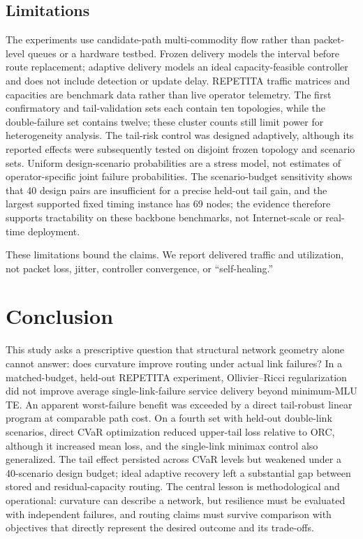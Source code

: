 \documentclass[preprint,12pt]{elsarticle}
\begin{document}
\subsection{Limitations}

The experiments use candidate-path multi-commodity flow rather than packet-level
queues or a hardware testbed. Frozen delivery models the interval before route
replacement; adaptive delivery models an ideal capacity-feasible controller and
does not include detection or update delay. REPETITA traffic matrices and
capacities are benchmark data rather than live operator telemetry. The
first confirmatory and tail-validation sets each contain ten topologies, while
the double-failure set contains twelve; these cluster counts still limit power
for heterogeneity analysis. The tail-risk control was designed adaptively,
although its reported effects were subsequently tested on disjoint frozen
topology and scenario sets. Uniform design-scenario probabilities are a stress
model, not estimates of operator-specific joint failure probabilities. The
scenario-budget sensitivity shows that 40 design pairs are insufficient for a
precise held-out tail gain, and the largest supported fixed timing instance has
69 nodes; the evidence therefore supports tractability on these backbone
benchmarks, not Internet-scale or real-time deployment.

These limitations bound the claims. We report delivered traffic and utilization,
not packet loss, jitter, controller convergence, or ``self-healing.''

\section{Conclusion}

This study asks a prescriptive question that structural network geometry alone
cannot answer: does curvature improve routing under actual link failures? In a
matched-budget, held-out REPETITA experiment, Ollivier--Ricci regularization did
not improve average single-link-failure service delivery beyond minimum-MLU TE.
An apparent worst-failure benefit was exceeded by a direct tail-robust linear
program at comparable path cost. On a fourth set with held-out double-link
scenarios, direct CVaR optimization reduced upper-tail loss relative to ORC,
although it increased mean loss, and the single-link minimax control also
generalized. The tail effect persisted across CVaR levels but weakened under a
40-scenario design budget; ideal adaptive recovery left a substantial gap
between stored and residual-capacity routing. The central lesson is
methodological and operational: curvature
can describe a network, but resilience must be evaluated with independent
failures, and routing claims must survive comparison with objectives that
directly represent the desired outcome and its trade-offs.
\end{document}
